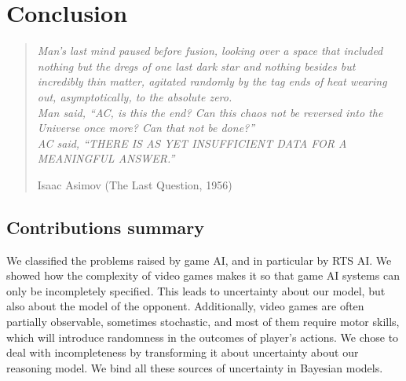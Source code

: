 \chapter{Conclusion}
\begin{quotation}\textit{
Man's last mind paused before fusion, looking over a space that included nothing but the dregs of one last dark star and nothing besides but incredibly thin matter, agitated randomly by the tag ends of heat wearing out, asymptotically, to the absolute zero.\\
Man said, ``AC, is this the end? Can this chaos not be reversed into the Universe once more? Can that not be done?''\\
AC said, ``THERE IS AS YET INSUFFICIENT DATA FOR A MEANINGFUL ANSWER.''
}
\begin{flushright}Isaac Asimov (The Last Question, 1956)\end{flushright}\end{quotation}


\section{Contributions summary}
We classified the problems raised by game AI, and in particular by RTS AI. We showed how the complexity of video games makes it so that game AI systems can only be incompletely specified. This leads to uncertainty about our model, but also about the model of the opponent. Additionally, video games are often partially observable, sometimes stochastic, and most of them require motor skills, which will introduce randomness in the outcomes of player's actions. We chose to deal with incompleteness by transforming it about uncertainty about our reasoning model. We bind all these sources of uncertainty in Bayesian models. 

